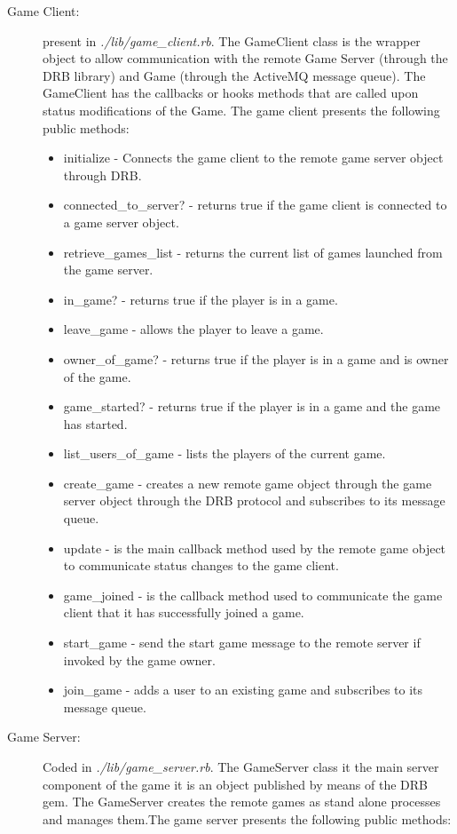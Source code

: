 \documentclass[a4paper,10pt,titlepage]{article}
\begin{document}
\begin{description}
\begin{itemize}
	\end{itemize} 
	\item[Game Client:] present in \textit{./lib/game\_client.rb}. The GameClient class is the wrapper object to allow communication with the remote Game Server (through the DRB library) and Game (through the ActiveMQ message queue). The GameClient has the callbacks or hooks methods that are called upon status modifications of the Game. The game client presents the following public methods:
	\begin{itemize}
		\item initialize - Connects the game client to the remote game server object through DRB. 
		\item connected\_to\_server? - returns true if the game client is connected to a game server object.
		\item retrieve\_games\_list - returns the current list of games launched from the game server.
		\item in\_game? - returns true if the player is in a game.
		\item leave\_game - allows the player to leave a game.
		\item owner\_of\_game? - returns true if the player is in a game and is owner of the game.
		\item game\_started? - returns true if the player is in a game and the game has started.
		\item list\_users\_of\_game - lists the players of the current game.
		\item create\_game - creates a new remote game object through the game server object through the DRB protocol and subscribes to its message queue.
		\item update - is the main callback method used by the remote game object to communicate status changes to the game client.
		\item game\_joined - is the callback method used to communicate the game client that it has successfully joined a game. 
		\item start\_game - send the start game message to the remote server if invoked by the game owner.
		\item join\_game - adds a user to an existing game and subscribes to its message queue. 
	\end{itemize}
	\item[Game Server:] Coded in \textit{./lib/game\_server.rb}. The GameServer class it the main server component of the game it is an object published by means of the DRB gem. The GameServer creates the remote games as stand alone processes and manages them.The game server presents the following public methods:

\end{description}
\end{document}
